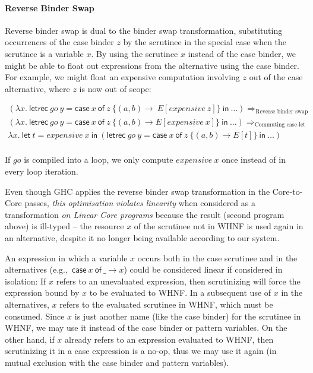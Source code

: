 \documentclass[acmsmall,review,anonymous,screen]{acmart}
\newcommand{\llet}[2]{\mathsf{let}~#1~\mathsf{in}~#2}
\newcommand{\lletrec}[2]{\mathsf{letrec}~#1~\mathsf{in}~#2}
\newcommand{\ccase}[2]{\mathsf{case}~#1~\mathsf{of}~#2}
\begin{document}
% 

\paragraph{Reverse Binder Swap\label{sec:reverse-binder-swap-considered-harmful}}

Reverse binder swap is dual to the binder swap transformation, substituting
occurrences of the case binder $z$ by the scrutinee in the special case when
the scrutinee is a variable $x$.
%
By using the scrutinee $x$ instead of the case binder, we might be able to
float out expressions from the alternative using the case binder. For example,
we might float an expensive computation involving $z$ out of the case
alternative, where $z$ is now out of scope:

{\small\[
\begin{array}{l}
(\lambda x.~\lletrec{go~y = \ccase{x}{z~\{(a,b) \to \ E[expensive~z] \} }}{\dots})
\Longrightarrow_\textrm{Reverse binder swap}\\
(\lambda x.~\lletrec{go~y = \ccase{x}{z~\{(a,b) \to E[expensive~x] \} }}{\dots})
\Longrightarrow_\textrm{Commuting case-let}\\
\lambda x.~\llet{t = \mathit{expensive}~x}{(\lletrec{go~y = \ccase{x}{z~\{(a,b) \to E[t] \} }}{\dots})}\\
\end{array}
\]}

\noindent If $go$ is compiled into a loop, we only compute
$\mathit{expensive}~x$ once instead of in every loop iteration.

Even though GHC applies the reverse binder swap transformation in the
Core-to-Core passes, \emph{this optimisation violates linearity} when considered
as a transformation \emph{on Linear Core programs} because the result (second program
above) is ill-typed -- the resource $x$ of the scrutinee not in WHNF is used
again in an alternative, despite it no longer being available according to our system.

An expression in which a variable $x$ occurs both in the case scrutinee and in
the alternatives (e.g.,~$\ccase{x}{\_ \to x}$) could be considered linear if
considered in isolation:
If $x$ refers to an unevaluated expression, then scrutinizing will force the expression
bound by $x$ to be evaluated to WHNF. In a subsequent use of
$x$ in the alternatives, $x$ refers to the evaluated scrutinee in WHNF, which
must be consumed. Since $x$ is just another name (like the case binder) for the
scrutinee in WHNF, we may use it instead of the case binder or pattern
variables.
%
On the other hand, if $x$ already refers to an expression evaluated to WHNF, then
scrutinizing it in a case expression is a no-op, thus we may use it again (in
mutual exclusion with the case binder and pattern variables).
\end{document}
